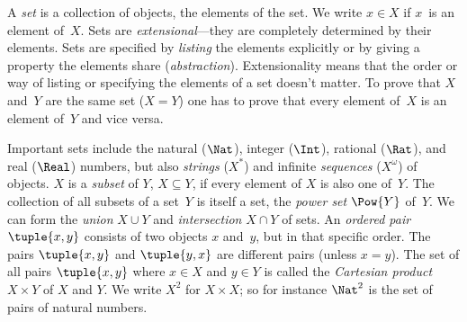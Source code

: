 A \emph{set} is a collection of objects, the elements of the set. We
write $x \in X$ if $x$~is an element of~$X$. Sets are
\emph{extensional}---they are completely determined by their elements.
Sets are specified by \emph{listing} the elements explicitly or by
giving a property the elements share
(\emph{abstraction}). Extensionality means that the order or way of
listing or specifying the elements of a set doesn't matter. To prove
that $X$ and~$Y$ are the same set ($X = Y$) one has to prove that
every element of~$X$ is an element of~$Y$ and vice versa.

Important sets include the natural ($\Nat$), integer ($\Int$), rational
($\Rat$), and real ($\Real$) numbers, but also \emph{strings} ($X^*$)
and infinite \emph{sequences} ($X^\omega$) of objects. $X$ is a
\emph{subset} of $Y$, $X \subseteq Y$, if every element of $X$ is also
one of~$Y$. The collection of all subsets of a set~$Y$ is itself a
set, the \emph{power set} $\Pow{Y}$ of~$Y$. We can form the
\emph{union} $X \cup Y$ and \emph{intersection} $X \cap Y$ of sets. An
\emph{ordered pair} $\tuple{x, y}$ consists of two objects $x$ and~$y$, but in
that specific order. The pairs $\tuple{x, y}$ and $\tuple{y, x}$ are
different pairs (unless $x = y$). The set of all pairs $\tuple{x, y}$
where $x \in X$ and $y\in Y$ is called the \emph{Cartesian product}~$X
\times Y$ of $X$ and $Y$. We write $X^2$ for $X \times X$; so for
instance $\Nat^2$ is the set of pairs of natural numbers.
